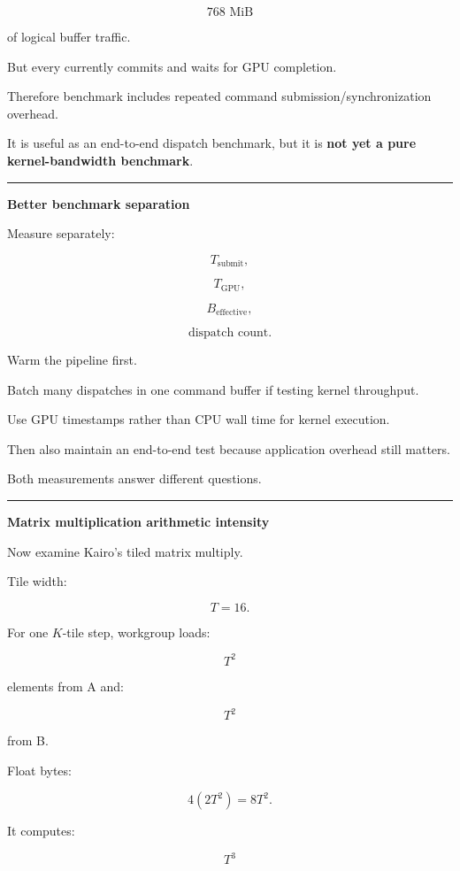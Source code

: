 \[
768\text{ MiB}
\]

of logical buffer traffic.

But every  currently commits and waits for GPU completion.

Therefore benchmark includes repeated command submission/synchronization overhead.

It is useful as an end-to-end dispatch benchmark, but it is \textbf{not yet a pure kernel-bandwidth benchmark}.

\begin{center}\rule{0.5\linewidth}{0.5pt}\end{center}

\textbf{Better benchmark separation}

Measure separately:

\[
T_{\text{submit}},
\]

\[
T_{\text{GPU}},
\]

\[
B_{\text{effective}},
\]

\[
\text{dispatch count}.
\]

Warm the pipeline first.

Batch many dispatches in one command buffer if testing kernel throughput.

Use GPU timestamps rather than CPU wall time for kernel execution.

Then also maintain an end-to-end test because application overhead still matters.

Both measurements answer different questions.

\begin{center}\rule{0.5\linewidth}{0.5pt}\end{center}

\textbf{Matrix multiplication arithmetic intensity}

Now examine Kairo's tiled matrix multiply.

Tile width:

\[
T=16.
\]

For one \(K\)-tile step, workgroup loads:

\[
T^2
\]

elements from A and:

\[
T^2
\]

from B.

Float bytes:

\[
4(2T^2)
=
8T^2.
\]

It computes:

\[
T^3
\]

